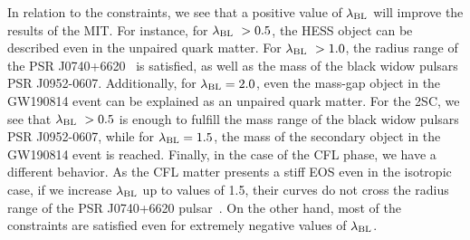 \documentclass[%
reprint,
superscriptaddress,
nofootinbib,
amsmath,
amssymb,
aps,
floatfix,
showkeys,
]{revtex4-2}
\begin{document}
In relation to the constraints, we see that a positive value of $\lambda_{\rm BL}$ will improve the results of the MIT. For instance, for $\lambda_{\rm BL}~>0.5$, the HESS object can be described even in the unpaired quark matter. For $\lambda_{\rm BL}~>1.0$, the radius range of the PSR J0740+6620~\cite{Miller_2021} is satisfied, as well as the mass of the black widow pulsars PSR J0952-0607. Additionally, for $\lambda_{\rm BL} = 2.0$, even the mass-gap object in the GW190814 event can be explained as an unpaired quark matter. For the 2SC, we see that  $\lambda_{\rm BL}~>0.5$ is enough to fulfill the mass range of the black widow pulsars PSR J0952-0607, while for $\lambda_{\rm BL} = 1.5$, the mass of the secondary object in the GW190814 event is reached. Finally, in the case of the CFL phase, we have a different behavior. As the CFL matter presents a stiff EOS even in the isotropic case, if we increase $\lambda_{\rm BL}$ up to values of 1.5, their curves do not cross the radius range of the PSR J0740+6620 pulsar~\cite{Miller_2021}. On the other hand, most of the constraints are satisfied even for extremely negative values of $\lambda_{\rm BL}$.
\end{document}
